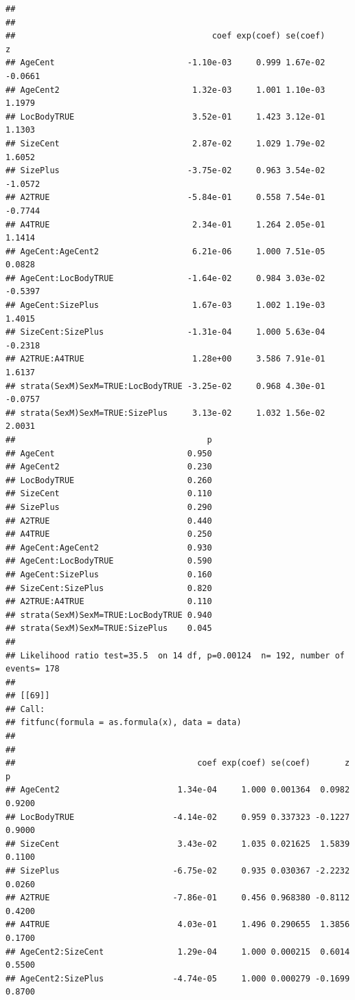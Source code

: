 \documentclass{article}\usepackage[]{graphicx}\usepackage[]{color}
\makeatletter
\newenvironment{kframe}{%
 \def\at@end@of@kframe{}%
 \ifinner\ifhmode%
  \def\at@end@of@kframe{\end{minipage}}%
  \begin{minipage}{\columnwidth}%
 \fi\fi%
 \def\FrameCommand##1{\hskip\@totalleftmargin \hskip-\fboxsep
 \colorbox{shadecolor}{##1}\hskip-\fboxsep
     \hskip-\linewidth \hskip-\@totalleftmargin \hskip\columnwidth}%
 \MakeFramed {\advance\hsize-\width
   \@totalleftmargin\z@ \linewidth\hsize
   \@setminipage}}%
 {\par\unskip\endMakeFramed%
 \at@end@of@kframe}
\newenvironment{knitrout}{}{} %
\makeatother
\begin{document}
\begin{knitrout}
\begin{kframe}
\begin{verbatim}
## 
## 
##                                        coef exp(coef) se(coef)       z
## AgeCent                           -1.10e-03     0.999 1.67e-02 -0.0661
## AgeCent2                           1.32e-03     1.001 1.10e-03  1.1979
## LocBodyTRUE                        3.52e-01     1.423 3.12e-01  1.1303
## SizeCent                           2.87e-02     1.029 1.79e-02  1.6052
## SizePlus                          -3.75e-02     0.963 3.54e-02 -1.0572
## A2TRUE                            -5.84e-01     0.558 7.54e-01 -0.7744
## A4TRUE                             2.34e-01     1.264 2.05e-01  1.1414
## AgeCent:AgeCent2                   6.21e-06     1.000 7.51e-05  0.0828
## AgeCent:LocBodyTRUE               -1.64e-02     0.984 3.03e-02 -0.5397
## AgeCent:SizePlus                   1.67e-03     1.002 1.19e-03  1.4015
## SizeCent:SizePlus                 -1.31e-04     1.000 5.63e-04 -0.2318
## A2TRUE:A4TRUE                      1.28e+00     3.586 7.91e-01  1.6137
## strata(SexM)SexM=TRUE:LocBodyTRUE -3.25e-02     0.968 4.30e-01 -0.0757
## strata(SexM)SexM=TRUE:SizePlus     3.13e-02     1.032 1.56e-02  2.0031
##                                       p
## AgeCent                           0.950
## AgeCent2                          0.230
## LocBodyTRUE                       0.260
## SizeCent                          0.110
## SizePlus                          0.290
## A2TRUE                            0.440
## A4TRUE                            0.250
## AgeCent:AgeCent2                  0.930
## AgeCent:LocBodyTRUE               0.590
## AgeCent:SizePlus                  0.160
## SizeCent:SizePlus                 0.820
## A2TRUE:A4TRUE                     0.110
## strata(SexM)SexM=TRUE:LocBodyTRUE 0.940
## strata(SexM)SexM=TRUE:SizePlus    0.045
## 
## Likelihood ratio test=35.5  on 14 df, p=0.00124  n= 192, number of events= 178 
## 
## [[69]]
## Call:
## fitfunc(formula = as.formula(x), data = data)
## 
## 
##                                     coef exp(coef) se(coef)       z      p
## AgeCent2                        1.34e-04     1.000 0.001364  0.0982 0.9200
## LocBodyTRUE                    -4.14e-02     0.959 0.337323 -0.1227 0.9000
## SizeCent                        3.43e-02     1.035 0.021625  1.5839 0.1100
## SizePlus                       -6.75e-02     0.935 0.030367 -2.2232 0.0260
## A2TRUE                         -7.86e-01     0.456 0.968380 -0.8112 0.4200
## A4TRUE                          4.03e-01     1.496 0.290655  1.3856 0.1700
## AgeCent2:SizeCent               1.29e-04     1.000 0.000215  0.6014 0.5500
## AgeCent2:SizePlus              -4.74e-05     1.000 0.000279 -0.1699 0.8700

\end{verbatim}
\end{kframe}
\end{knitrout}
\end{document}
